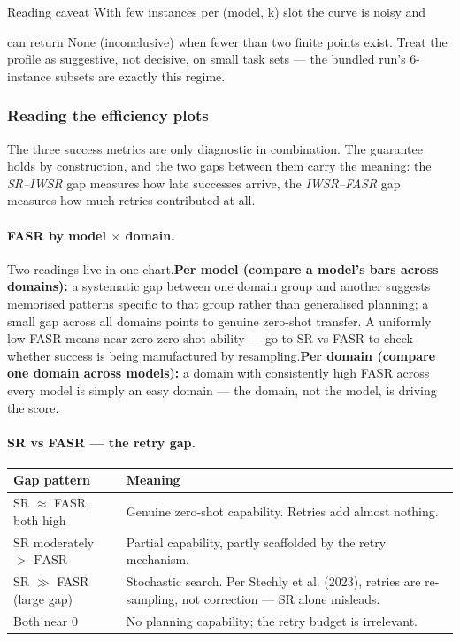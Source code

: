 \begin{bmcavbox}{Reading caveat}
With few instances per (model, k) slot the curve is noisy and


can return None (inconclusive) when fewer than two finite points exist. Treat the profile as suggestive, not decisive, on small task sets --- the bundled run's 6-instance subsets are exactly this regime.
\end{bmcavbox}

\subsubsection{Reading the efficiency plots}

The three success metrics are only diagnostic in combination. The guarantee  holds by construction, and the two gaps between them carry the meaning: the \emph{SR--IWSR} gap measures how late successes arrive, the \emph{IWSR--FASR} gap measures how much retries contributed at all.

\paragraph{FASR by model \(\times\) domain.}

Two readings live in one chart.\textbf{Per model (compare a model's bars across domains):} a systematic gap between one domain group and another suggests memorised patterns specific to that group rather than generalised planning; a small gap across all domains points to genuine zero-shot transfer. A uniformly low FASR means near-zero zero-shot ability --- go to SR-vs-FASR to check whether success is being manufactured by resampling.\textbf{Per domain (compare one domain across models):} a domain with consistently high FASR across every model is simply an easy domain --- the domain, not the model, is driving the score.

\paragraph{SR vs FASR --- the retry gap.}

\begin{table}[h]\small
\centering
\begin{tabularx}{\linewidth}{@{}l Y@{}}
\toprule
Gap pattern & Meaning\\
\midrule
SR \(\approx\) FASR, both high & Genuine zero-shot capability. Retries add almost nothing.\\
\addlinespace
\(\mathrm{SR}\) moderately \(>\) \(\mathrm{FASR}\) & Partial capability, partly scaffolded by the retry mechanism.\\
\addlinespace
SR \(\gg\) FASR (large gap) & Stochastic search. Per Stechly et al. (2023), retries are re-sampling, not correction --- SR alone misleads.\\
\addlinespace
Both near 0 & No planning capability; the retry budget is irrelevant.\\
\bottomrule
\end{tabularx}
\end{table}

